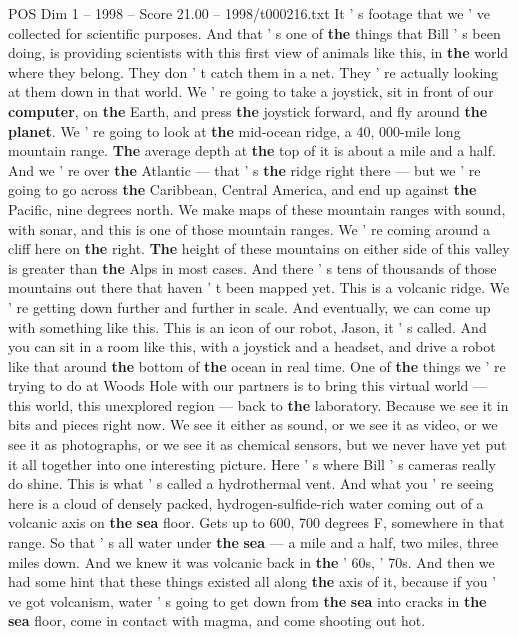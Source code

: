 \begin{textsample}{POS Dim 1 – 1998 – Score 21.00 – 1998/t000216.txt}
It ' s footage that we ' ve collected for scientific purposes.
And that ' s one of \textbf{the} things that Bill ' s been doing, is providing scientists with this first view of animals like this, in \textbf{the} world where they belong.
They don ' t catch them in a net.
They ' re actually looking at them down in that world.
We ' re going to take a joystick, sit in front of our \textbf{computer}, on \textbf{the} Earth, and press \textbf{the} joystick forward, and fly around \textbf{the} \textbf{planet}.
We ' re going to look at \textbf{the} mid-ocean ridge, a 40, 000-mile long mountain range. \textbf{The} average depth at \textbf{the} top of it is about a mile and a half.
And we ' re over \textbf{the} Atlantic — that ' s \textbf{the} ridge right there — but we ' re going to go across \textbf{the} Caribbean, Central America, and end up against \textbf{the} Pacific, nine degrees north.
We make maps of these mountain ranges with sound, with sonar, and this is one of those mountain ranges.
We ' re coming around a cliff here on \textbf{the} right. \textbf{The} height of these mountains on either side of this valley is greater than \textbf{the} Alps in most cases.
And there ' s tens of thousands of those mountains out there that haven ' t been mapped yet.
This is a volcanic ridge.
We ' re getting down further and further in scale.
And eventually, we can come up with something like this.
This is an icon of our robot, Jason, it ' s called.
And you can sit in a room like this, with a joystick and a headset, and drive a robot like that around \textbf{the} bottom of \textbf{the} ocean in real time.
One of \textbf{the} things we ' re trying to do at Woods Hole with our partners is to bring this virtual world — this world, this unexplored region — back to \textbf{the} laboratory.
Because we see it in bits and pieces right now.
We see it either as sound, or we see it as video, or we see it as photographs, or we see it as chemical sensors, but we never have yet put it all together into one interesting picture.
Here ' s where Bill ' s cameras really do shine.
This is what ' s called a hydrothermal vent.
And what you ' re seeing here is a cloud of densely packed, hydrogen-sulfide-rich water coming out of a volcanic axis on \textbf{the} \textbf{sea} floor.
Gets up to 600, 700 degrees F, somewhere in that range.
So that ' s all water under \textbf{the} \textbf{sea} — a mile and a half, two miles, three miles down.
And we knew it was volcanic back in \textbf{the} ' 60s, ' 70s.
And then we had some hint that these things existed all along \textbf{the} axis of it, because if you ' ve got volcanism, water ' s going to get down from \textbf{the} \textbf{sea} into cracks in \textbf{the} \textbf{sea} floor, come in contact with magma, and come shooting out hot.

\end{textsample}
